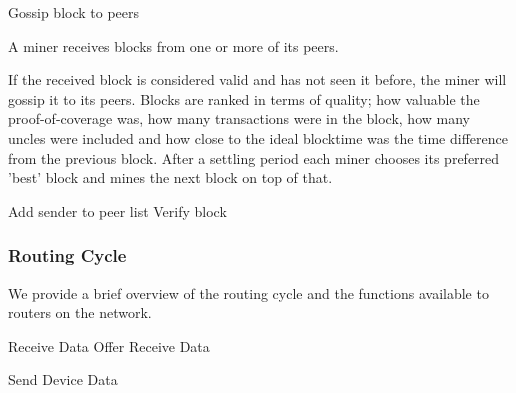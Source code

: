 \documentclass[letterpaper,11pt]{article}
\begin{document}
\begin{description}
    \begin{algorithm}[!htb]
      \DontPrintSemicolon
      \caption{Miner Block Submit}\label{proto:miner.block.submit}

       {
        Gossip block to peers\;
      }
    \end{algorithm}
    \FloatBarrier

  \item [Receive Block] A miner receives blocks from one or more of its peers.

    If the received block is considered valid and has not seen it before, the miner will gossip it to its peers. Blocks are ranked in terms of quality; how valuable the proof-of-coverage was, how many transactions were in the block, how many uncles were included and how close to the ideal blocktime was the time difference from the previous block. After a settling period each miner chooses its preferred 'best' block and mines the next block on top of that.

    \begin{algorithm}[!htb]
      \DontPrintSemicolon
      \caption{Miner Block Receive}\label{proto:miner.block.recv}

       {
        Add sender to peer list\;
        Verify block\;
      }
    \end{algorithm}
    \FloatBarrier

\end{description}


\subsubsection{Routing Cycle}

We provide a brief overview of the routing cycle and the functions available to routers on the network.

\begin{algorithm}[!htb]
  \DontPrintSemicolon
  \caption{Router Cycle Overview}\label{cycle:router}

   {
    Receive Data Offer \;
    Receive Data \;
  }

   {
    Send Device Data \;
  }
\end{algorithm}
\FloatBarrier
\end{document}
